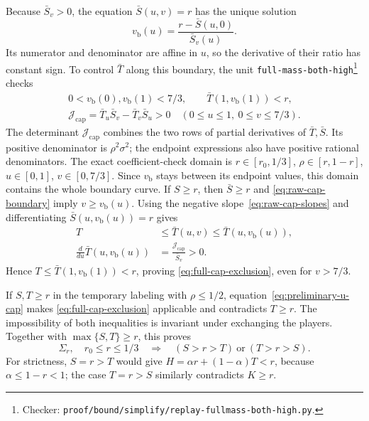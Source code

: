 \documentclass[11pt]{article}
\theoremstyle{remark}
\theoremstyle{plain}
\begin{document}
Because $\bar S_v>0$, the equation $\bar S(u,v)=r$ has the unique
solution
\begin{equation}
 v_{\mathrm b}(u)=\frac{r-\bar S(u,0)}{\bar S_v(u)}.
 \label{eq:raw-cap-boundary}
\end{equation}
Its numerator and denominator are affine in $u$, so the derivative
of their ratio has constant sign. To control $\bar T$ along this
boundary, the unit \nolinkurl{full-mass-both-high}\footnote{Checker:
\nolinkurl{proof/bound/simplify/replay-fullmass-both-high.py}.\label{fn:checker-full-mass-both-high}} checks
\begin{equation}
 \begin{gathered}
 0<v_{\mathrm b}(0),v_{\mathrm b}(1)<7/3,\qquad
 \bar T(1,v_{\mathrm b}(1))<r,\\
 \mathcal J_{\mathrm{cap}}
       =\bar T_u\bar S_v-\bar T_v\bar S_u>0
       \quad(0\le u\le1,\ 0\le v\le7/3).
 \end{gathered}
 \label{eq:cap-boundary-signs}
\end{equation}
The determinant $\mathcal J_{\mathrm{cap}}$ combines the two rows
of partial derivatives of $\bar T,\bar S$. Its positive denominator
is $\rho^2\sigma^2$; the endpoint expressions also have positive
rational denominators. The exact coefficient-check domain is
$r\in[r_0,1/3]$, $\rho\in[r,1-r]$, $u\in[0,1]$,
$v\in[0,7/3]$. Since $v_{\mathrm b}$ stays between its endpoint
values, this domain contains the whole boundary curve.
If $S\ge r$, then $\bar S\ge r$ and
\eqref{eq:raw-cap-boundary} imply $v\ge v_{\mathrm b}(u)$.
Using the negative slope~\eqref{eq:raw-cap-slopes} and differentiating
$\bar S(u,v_{\mathrm b}(u))=r$ gives
\begin{equation}
 \begin{aligned}
 T&\le\bar T(u,v)\le\bar T(u,v_{\mathrm b}(u)),\\
 \frac{d}{du}\bar T(u,v_{\mathrm b}(u))
   &=\frac{\mathcal J_{\mathrm{cap}}}{\bar S_v}>0.
 \end{aligned}
 \label{eq:cap-boundary-comparison}
\end{equation}
Hence $T\le\bar T(1,v_{\mathrm b}(1))<r$, proving
\eqref{eq:full-cap-exclusion}, even for $v>7/3$.

If $S,T\ge r$ in the temporary labeling with $\rho\le1/2$,
equation~\eqref{eq:preliminary-u-cap} makes
\eqref{eq:full-cap-exclusion} applicable and contradicts $T\ge r$.
The impossibility of both inequalities is invariant under exchanging
the players. Together with $\max\{S,T\}\ge r$, this proves
\begin{equation}
 \Sigma_r,\quad r_0\le r\le1/3
 \quad\Longrightarrow\quad
 (S>r>T)\ \text{or}\ (T>r>S).
 \label{eq:strict-bound-orientation}
\end{equation}
For strictness, $S=r>T$ would give
$H=\alpha r+(1-\alpha)T<r$, because $\alpha\le1-r<1$;
the case $T=r>S$ similarly contradicts $K\ge r$.
\end{document}
